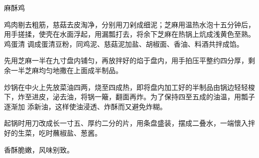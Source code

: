 \begin{recipe}{麻酥鸡}

\ingredients


\preparation

\step 鸡肉剔去粗筋，慈菇去皮淘净，分别用刀剁成细泥；芝麻用温热水泡十五分钟后，
用手搓揉，使壳在水面浮起，用漏瓢打去，将余下芝麻在热锅上炕成浅黄色至熟。鸡蛋清
调成蛋清豆粉，同鸡泥、慈菇泥加盐、胡椒面、香油、料酒共拌成馅。

\step 先用芝麻一半在九寸盘内铺匀，再放拌好的焰于盘内，用手拍压平整约四分厚，剩
余一半芝麻均匀地撒在上面成半制品。

\step 炒锅在中火上先放菜油四两，烧至四成热，即将盘内加工好的半制品由锅边轻轻梭
下，炸至进皮，泌去油，将锅一簸，翻面再炸。为了保持四至五成的油温，用瓢子逐渐加
添新油，这样使油浸透、炸酥而又避免炸糊。

\step 起锅时用刀改成长一寸五、厚约二分的片，用条盘盛装，摆成二叠水，一端懷入拌
好的生菜，吃时蘸椒盐、葱酱。

\features

香酥脆嫩，风味别致。

\end{recipe}

